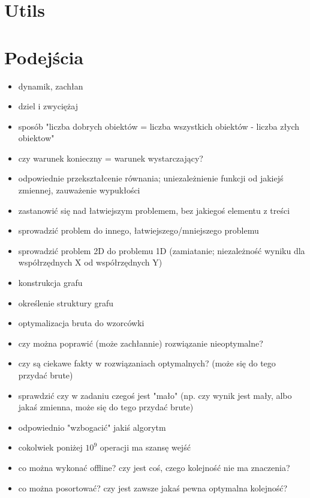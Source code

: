 \chapter{Utils}


\chapter{Podejścia}

\begin{itemize}[noitemsep]
	\item dynamik, zachłan
	\item dziel i zwyciężaj
	\item sposób "liczba dobrych obiektów = liczba wszystkich obiektów - liczba złych obiektow"
	\item czy warunek konieczny = warunek wystarczający?
	\item odpowiednie przekształcenie równania; uniezależnienie funkcji od jakiejś zmiennej, zauważenie wypukłości
	\item zastanowić się nad łatwiejszym problemem, bez jakiegoś elementu z treści
	\item sprowadzić problem do innego, łatwiejszego/mniejszego problemu
	\item sprowadzić problem 2D do problemu 1D (zamiatanie; niezależność wyniku dla współrzędnych X od współrzędnych Y)
	\item konstrukcja grafu
	\item określenie struktury grafu
	\item optymalizacja bruta do wzorcówki
	\item czy można poprawić (może zachłannie) rozwiązanie nieoptymalne?
	\item czy są ciekawe fakty w rozwiązaniach optymalnych? (może się do tego przydać brute)
	\item sprawdzić czy w zadaniu czegoś jest "mało" (np. czy wynik jest mały, albo jakaś zmienna, może się do tego przydać brute)
	\item odpowiednio "wzbogacić" jakiś algorytm
	\item cokolwiek poniżej $10^9$ operacji ma szansę wejść
	\item co można wykonać offline? czy jest coś, czego kolejność nie ma znaczenia?
	\item co można posortować? czy jest zawsze jakaś pewna optymalna kolejność?

\end{itemize}
